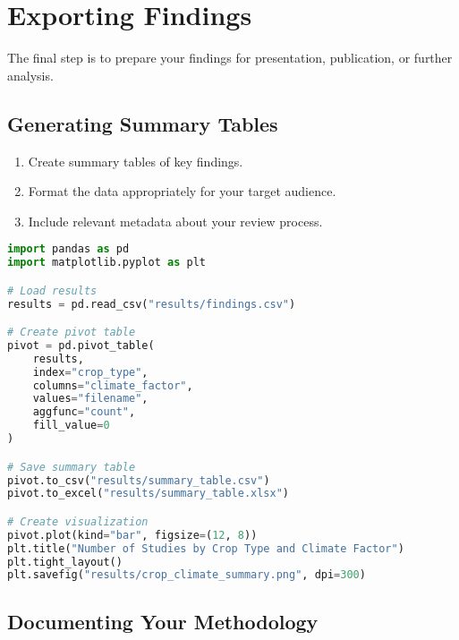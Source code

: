 \section{Exporting Findings}

The final step is to prepare your findings for presentation, publication, or further analysis.

\subsection{Generating Summary Tables}

\begin{enumerate}
    \item Create summary tables of key findings.
    \item Format the data appropriately for your target audience.
    \item Include relevant metadata about your review process.
\end{enumerate}

\begin{commandbox}
\begin{lstlisting}[language=Python]
import pandas as pd
import matplotlib.pyplot as plt

# Load results
results = pd.read_csv("results/findings.csv")

# Create pivot table
pivot = pd.pivot_table(
    results,
    index="crop_type",
    columns="climate_factor",
    values="filename",
    aggfunc="count",
    fill_value=0
)

# Save summary table
pivot.to_csv("results/summary_table.csv")
pivot.to_excel("results/summary_table.xlsx")

# Create visualization
pivot.plot(kind="bar", figsize=(12, 8))
plt.title("Number of Studies by Crop Type and Climate Factor")
plt.tight_layout()
plt.savefig("results/crop_climate_summary.png", dpi=300)
\end{lstlisting}
\end{commandbox}

\subsection{Documenting Your Methodology}

